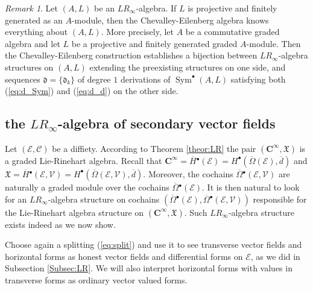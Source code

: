 \documentclass{conm-p-l}
\theoremstyle{definition}
\theoremstyle{remark}
\newtheorem{remark}[theorem]{Remark}
\numberwithin{equation}{section}
\begin{document}
\begin{remark}
Let $(A, L)$ be an $LR_\infty$-algebra. If $L$ is projective and finitely generated as an $A$-module, then the Chevalley-Eilenberg algebra knows everything about $(A, L)$. More precisely, let $A$ be a commutative graded algebra and let $L$ be a projective and finitely generated graded $A$-module. Then the Chevalley-Eilenberg construction establishes a bijection between $LR_\infty$-algebra structures on $(A, L)$ extending the preexisting structures on one side, and sequences $\mathfrak d = \{ \mathfrak d_k\}$ of degree $1$ derivations of $\operatorname{Sym}^\bullet(A, L)$ satisfying both (\ref{eq:d_Sym}) and (\ref{eq:d_d}) on the other side.
\end{remark}


\subsection{the $LR_\infty$-algebra of secondary vector fields}

Let $(\mathscr E, \mathscr C)$ be a diffiety. According to Theorem \ref{theor:LR} the pair $(\boldsymbol C^\infty, \boldsymbol{\mathfrak X})$ is a graded Lie-Rinehart algebra. Recall that $\boldsymbol C^\infty = \overline H{}^\bullet (\mathscr E) = H^\bullet (\overline \Omega (\mathscr E), \overline d)$ and $\boldsymbol{\mathfrak X} = \overline H{}^\bullet (\mathscr E, \mathscr V) = H^\bullet(\overline \Omega(\mathscr E, \mathscr V), \overline d)$. Moreover, the cochains $\overline \Omega{}^\bullet(\mathscr E, \mathscr V)$ are naturally a graded module over the cochains $\overline \Omega{}^\bullet (\mathscr E)$. It is then natural to look for an $LR_\infty$-algebra structure on cochains $(\overline \Omega{}^\bullet (\mathscr E), \overline \Omega{}^\bullet(\mathscr E, \mathscr V))$ responsible for the Lie-Rinehart algebra structure on $(\boldsymbol C^\infty, \boldsymbol{\mathfrak X})$. Such $LR_\infty$-algebra structure exists indeed as we now show. 

Choose again a splitting (\ref{eq:split}) and use it to see transverse vector fields and horizontal forms as honest vector fields and differential forms on $\mathscr E$, as we did in Subsection \ref{Subsec:LR}. We will also interpret horizontal forms with values in transverse forms as ordinary vector valued forms.
\end{document}
